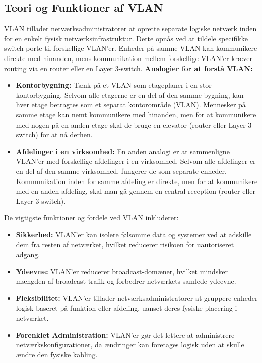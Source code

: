 \subsection{Teori og Funktioner af VLAN}
VLAN tillader netværksadministratorer at oprette separate logiske netværk inden for en enkelt fysisk netværksinfrastruktur. Dette opnås ved at tildele specifikke switch-porte til forskellige VLAN'er. Enheder på samme VLAN kan kommunikere direkte med hinanden, mens kommunikation mellem forskellige VLAN'er kræver routing via en router eller en Layer 3-switch.
\newline\newline\noindent
\textbf{Analogier for at forstå VLAN:}
\begin{itemize}
	\item \textbf{Kontorbygning:} Tænk på et VLAN som etageplaner i en stor kontorbygning. Selvom alle etagerne er en del af den samme bygning, kan hver etage betragtes som et separat kontorområde (VLAN). Mennesker på samme etage kan nemt kommunikere med hinanden, men for at kommunikere med nogen på en anden etage skal de bruge en elevator (router eller Layer 3-switch) for at nå derhen.
	\item \textbf{Afdelinger i en virksomhed:} En anden analogi er at sammenligne VLAN'er med forskellige afdelinger i en virksomhed. Selvom alle afdelinger er en del af den samme virksomhed, fungerer de som separate enheder. Kommunikation inden for samme afdeling er direkte, men for at kommunikere med en anden afdeling, skal man gå gennem en central reception (router eller Layer 3-switch).
\end{itemize}

\noindent De vigtigste funktioner og fordele ved VLAN inkluderer:
\begin{itemize}
	\item \textbf{Sikkerhed:} VLAN'er kan isolere følsomme data og systemer ved at adskille dem fra resten af netværket, hvilket reducerer risikoen for uautoriseret adgang.
	\item \textbf{Ydeevne:} VLAN'er reducerer broadcast-domæner, hvilket mindsker mængden af broadcast-trafik og forbedrer netværkets samlede ydeevne.
	\item \textbf{Fleksibilitet:} VLAN'er tillader netværksadministratorer at gruppere enheder logisk baseret på funktion eller afdeling, uanset deres fysiske placering i netværket.
	\item \textbf{Forenklet Administration:} VLAN'er gør det lettere at administrere netværkskonfigurationer, da ændringer kan foretages logisk uden at skulle ændre den fysiske kabling.
\end{itemize}

